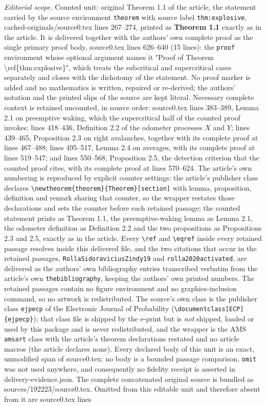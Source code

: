 \documentclass[10pt,a4paper]{amsart}
\begin{document}
\noindent\textit{Editorial scope.} Counted unit: original Theorem 1.1 of the article, the statement carried by the source environment \texttt{theorem} with source label \texttt{thm:explosive}, cached-originals/source0.tex lines 267--274, printed as \textbf{Theorem 1.1} exactly as in the article. It is delivered together with the authors' own complete proof as the single primary proof body, source0.tex lines 626--640 (15 lines): the \texttt{proof} environment whose optional argument names it "Proof of Theorem \textbackslash ref\{thm:explosive\}", which treats the subcritical and supercritical cases separately and closes with the dichotomy of the statement. No proof marker is added and no mathematics is written, repaired or re-derived; the authors' notation and the printed slips of the source are kept literal. Necessary complete context is retained uncounted, in source order: source0.tex lines 383--389, Lemma 2.1 on preemptive waking, which the supercritical half of the counted proof invokes; lines 418--436, Definition 2.2 of the odometer processes $X$ and $Y$; lines 439--465, Proposition 2.3 on right avalanches, together with its complete proof at lines 467--488; lines 495--517, Lemma 2.4 on averages, with its complete proof at lines 519--547; and lines 550--568, Proposition 2.5, the detection criterion that the counted proof cites, with its complete proof at lines 570--624. The article's own numbering is reproduced by explicit counter settings: the article's publisher class declares \texttt{\textbackslash newtheorem\{theorem\}\{Theorem\}[section]} with lemma, proposition, definition and remark sharing that counter, so the wrapper restates those declarations and sets the counter before each retained passage; the counted statement prints as Theorem 1.1, the preemptive-waking lemma as Lemma 2.1, the odometer definition as Definition 2.2 and the two propositions as Propositions 2.3 and 2.5, exactly as in the article. Every \texttt{\textbackslash ref} and \texttt{\textbackslash eqref} inside every retained passage resolves inside this delivered file, and the two citations that occur in the retained passages, \texttt{RollaSidoraviciusZindy19} and \texttt{rolla2020activated}, are delivered as the authors' own bibliography entries transcribed verbatim from the article's own \texttt{thebibliography}, keeping the authors' own printed numbers. The retained passages contain no figure environment and no graphics-inclusion command, so no artwork is redistributed. The source's own class is the publisher class \texttt{ejpecp} of the Electronic Journal of Probability (\texttt{\textbackslash documentclass[ECP]\{ejpecp\}}); that class file is shipped by the e-print but is \emph{not} shipped, loaded or used by this package and is never redistributed, and the wrapper is the AMS \texttt{amsart} class with the article's theorem declarations restated and no article macros (the article declares none). Every declared body of this unit is an exact, unmodified span of source0.tex: no body is a bounded passage comparison, \texttt{omit} was not used anywhere, and consequently no fidelity receipt is asserted in delivery-evidence.json. The complete concatenated original source is bundled as sources/192223/source0.tex. Omitted from this editable unit and therefore absent from it are source0.tex lines 
\end{document}
